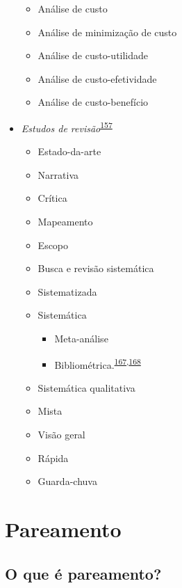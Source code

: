 \documentclass[
  a4paper,
]{book}
\begin{document}
\begin{itemize}
  \begin{itemize}
  \item
    Análise de custo
  \item
    Análise de minimização de custo
  \item
    Análise de custo-utilidade
  \item
    Análise de custo-efetividade
  \item
    Análise de custo-benefício
  \end{itemize}
\item
  \emph{Estudos de revisão}\textsuperscript{\protect\hyperlink{ref-Grant2009}{157}}

  \begin{itemize}
  \item
    Estado-da-arte
  \item
    Narrativa
  \item
    Crítica
  \item
    Mapeamento
  \item
    Escopo
  \item
    Busca e revisão sistemática
  \item
    Sistematizada
  \item
    Sistemática

    \begin{itemize}
    \item
      Meta-análise
    \item
      Bibliométrica.\textsuperscript{\protect\hyperlink{ref-donthu2021}{167},\protect\hyperlink{ref-lim2023}{168}}
    \end{itemize}
  \item
    Sistemática qualitativa
  \item
    Mista
  \item
    Visão geral
  \item
    Rápida
  \item
    Guarda-chuva
  \end{itemize}
\end{itemize}

\hypertarget{pareamento}{%
\section{Pareamento}\label{pareamento}}

\hypertarget{o-que-uxe9-pareamento}{%
\subsection{O que é pareamento?}\label{o-que-uxe9-pareamento}}
\end{document}
